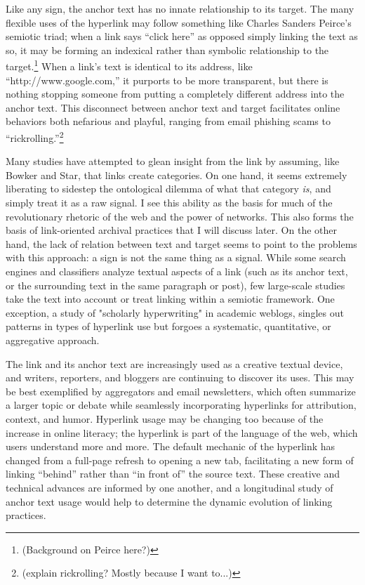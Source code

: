 Like any sign, the anchor text has no innate relationship to its target. The many flexible uses of the hyperlink may follow something like Charles Sanders Peirce's semiotic triad; when a link says ``click here'' as opposed simply linking the text as so, it may be forming an indexical rather than symbolic relationship to the target.\footnote{(Background on Peirce here?)} When a link's text is identical to its address, like ``http://www.google.com,'' it purports to be more transparent, but there is nothing stopping someone from putting a completely different address into the anchor text. This disconnect between anchor text and target facilitates online behaviors both nefarious and playful, ranging from email phishing scams to ``rickrolling.''\footnote{(explain rickrolling? Mostly because I want to...)}

Many studies have attempted to glean insight from the link by assuming, like Bowker and Star, that links create categories. On one hand, it seems extremely liberating to sidestep the ontological dilemma of what that category \emph{is}, and simply treat it as a raw signal. I see this ability as the basis for much of the revolutionary rhetoric of the web and the power of networks. This also forms the basis of link-oriented archival practices that I will discuss later. %
On the other hand, the lack of relation between text and target seems to point to the problems with this approach: a sign is not the same thing as a signal. While some search engines and classifiers analyze textual aspects of a link (such as its anchor text, or the surrounding text in the same paragraph or post), few large-scale studies take the text into account or treat linking within a semiotic framework. One exception, a study of "scholarly hyperwriting" in academic weblogs, singles out patterns in types of hyperlink use but forgoes a systematic, quantitative, or aggregative approach.\autocite{luzon_scholarly_2009}

The link and its anchor text are increasingly used as a creative textual device, and writers, reporters, and bloggers are continuing to discover its uses. This may be best exemplified by aggregators and email newsletters, which often summarize a larger topic or debate while seamlessly incorporating hyperlinks for attribution, context, and humor. Hyperlink usage may be changing too because of the increase in online literacy; the hyperlink is part of the language of the web, which users understand more and more. The default mechanic of the hyperlink has changed from a full-page refresh to opening a new tab, facilitating a new form of linking ``behind'' rather than ``in front of'' the source text. These creative and technical advances are informed by one another, and a longitudinal study of anchor text usage would help to determine the dynamic evolution of linking practices.

